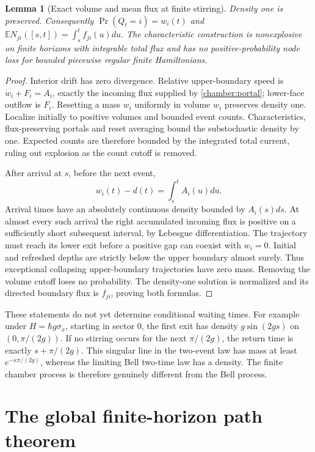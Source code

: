 \documentclass[11pt,oneside,openany]{book}
\newtheorem{lemma}[theorem]{Lemma}
\theoremstyle{definition}
\theoremstyle{remark}\newtheorem{remark}[theorem]{Remark}
\begin{document}
\begin{lemma}[Exact volume and mean flux at finite stirring]
\label{chamber:volume}
Density one is preserved. Consequently $\Pr(Q_t=i)=w_i(t)$ and
$\mathbb E N_{ji}([s,t])=\int_s^tf_{ji}(u)du$. The characteristic construction is nonexplosive on finite horizons with integrable total flux and has no positive-probability node loss for bounded piecewise regular finite Hamiltonians.
\end{lemma}
\begin{proof}
Interior drift has zero divergence. Relative upper-boundary speed is $\dot w_i+F_i=A_i$, exactly the incoming flux supplied by \eqref{chamber:portal}; lower-face outflow is $F_i$. Resetting a mass $w_i$ uniformly in volume $w_i$ preserves density one. Localize initially to positive volumes and bounded event counts. Characteristics, flux-preserving portals and reset averaging bound the substochastic density by one. Expected counts are therefore bounded by the integrated total current, ruling out explosion as the count cutoff is removed.

After arrival at $s$, before the next event,
\[
 w_i(t)-d(t)=\int_s^tA_i(u)du.
\]
Arrival times have an absolutely continuous density bounded by $A_i(s)ds$. At almost every such arrival the right accumulated incoming flux is positive on a sufficiently short subsequent interval, by Lebesgue differentiation. The trajectory must reach its lower exit before a positive gap can coexist with $w_i=0$. Initial and refreshed depths are strictly below the upper boundary almost surely. Thus exceptional collapsing upper-boundary trajectories have zero mass. Removing the volume cutoff loses no probability. The density-one solution is normalized and its directed boundary flux is $f_{ji}$, proving both formulas.
\end{proof}

These statements do not yet determine conditional waiting times. For example under $H=\hbar g\sigma_x$, starting in sector 0, the first exit has density $g\sin(2gs)$ on $(0,\pi/(2g))$. If no stirring occurs for the next $\pi/(2g)$, the return time is exactly $s+\pi/(2g)$. This singular line in the two-event law has mass at least $e^{-\kappa\pi/(2g)}$, whereas the limiting Bell two-time law has a density. The finite chamber process is therefore genuinely different from the Bell process.

\section{The global finite-horizon path theorem}
\end{document}
